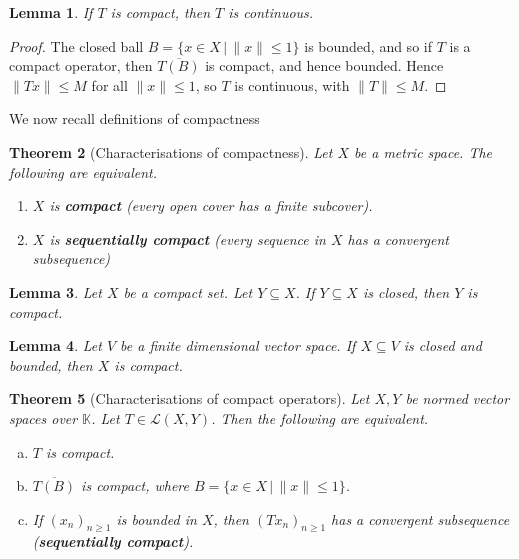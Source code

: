 \documentclass[justified]{tufte-book}
\theoremstyle{plain}%
\newtheorem{thm}{Theorem}[chapter]
\newtheorem{lem}[thm]{Lemma}
\theoremstyle{definition}
\theoremstyle{remark}
\newcommand{\given}{ \, | \,}
\newcommand{\K}{\mathbb{K}}
\begin{document}
\begin{lem}
  If $T$ is compact, then $T$ is continuous.
\end{lem}
\begin{proof}
  The closed ball $B  = \{ x \in X \given \| x \| \leq 1 \}$ is bounded, and so if $T$ is a compact operator, then $\overline{T(B)}$ is compact, and hence bounded.  Hence $\| Tx \| \leq M$ for all $\| x \| \leq 1$, so $T$ is continuous, with $\| T \| \leq M$.  
\end{proof}

We now recall definitions of compactness
\begin{thm}[Characterisations of compactness]
  Let $X$ be a metric space. The following are equivalent.  
  \begin{enumerate}[(1)]
      \item $X$ is \textbf{compact} (every open cover has a finite subcover).
      \item $X$ is \textbf{sequentially compact} (every sequence in $X$ has a convergent subsequence)
  \end{enumerate}
\end{thm}

\begin{lem}
  Let $X$ be a compact set.  Let $Y \subseteq X$. If $Y \subseteq X$ is closed, then $Y$ is compact.
\end{lem}

\begin{lem}
  Let $V$ be a finite dimensional vector space.  If $X \subseteq V$ is closed and bounded, then $X$ is compact.
\end{lem}

\begin{thm}[Characterisations of compact operators]
  \label{thm:charcompact}
  Let $X, Y$ be normed vector spaces over $\K$.  Let $T \in \mathcal L(X,Y)$.  Then the following are equivalent.
  \begin{enumerate}[(a)]
      \item $T$ is compact.
      \item $\overline{T(B)}$ is compact, where $B = \{ x \in X \given \| x \| \leq 1 \}$.  
      \item If $(x_n)_{n \geq 1}$ is bounded in $X$, then $(Tx_n)_{n \geq 1}$ has a convergent subsequence (\textbf{sequentially compact}).
  \end{enumerate}
\end{thm}
\end{document}

